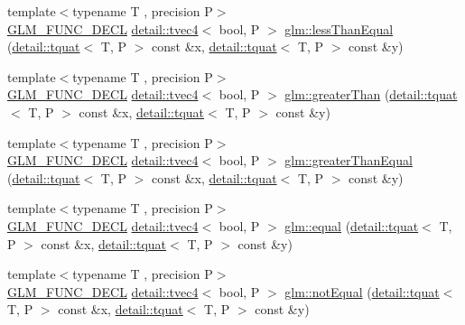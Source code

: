 \begin{DoxyCompactItemize}
\item 
{\footnotesize template$<$typename T , precision P$>$ }\\\hyperlink{setup_8hpp_ab2d052de21a70539923e9bcbf6e83a51}{G\+L\+M\+\_\+\+F\+U\+N\+C\+\_\+\+D\+E\+CL} \hyperlink{structglm_1_1detail_1_1tvec4}{detail\+::tvec4}$<$ bool, P $>$ \hyperlink{group__gtc__quaternion_ga313fe20896a8cd43c6d08cc88fa18faa}{glm\+::less\+Than\+Equal} (\hyperlink{structglm_1_1detail_1_1tquat}{detail\+::tquat}$<$ T, P $>$ const \&x, \hyperlink{structglm_1_1detail_1_1tquat}{detail\+::tquat}$<$ T, P $>$ const \&y)
\item 
{\footnotesize template$<$typename T , precision P$>$ }\\\hyperlink{setup_8hpp_ab2d052de21a70539923e9bcbf6e83a51}{G\+L\+M\+\_\+\+F\+U\+N\+C\+\_\+\+D\+E\+CL} \hyperlink{structglm_1_1detail_1_1tvec4}{detail\+::tvec4}$<$ bool, P $>$ \hyperlink{group__gtc__quaternion_ga63be67bccef0b0ad4e60656223ab3761}{glm\+::greater\+Than} (\hyperlink{structglm_1_1detail_1_1tquat}{detail\+::tquat}$<$ T, P $>$ const \&x, \hyperlink{structglm_1_1detail_1_1tquat}{detail\+::tquat}$<$ T, P $>$ const \&y)
\item 
{\footnotesize template$<$typename T , precision P$>$ }\\\hyperlink{setup_8hpp_ab2d052de21a70539923e9bcbf6e83a51}{G\+L\+M\+\_\+\+F\+U\+N\+C\+\_\+\+D\+E\+CL} \hyperlink{structglm_1_1detail_1_1tvec4}{detail\+::tvec4}$<$ bool, P $>$ \hyperlink{group__gtc__quaternion_gac90d5af34a03cd665a349ac30e4cc44c}{glm\+::greater\+Than\+Equal} (\hyperlink{structglm_1_1detail_1_1tquat}{detail\+::tquat}$<$ T, P $>$ const \&x, \hyperlink{structglm_1_1detail_1_1tquat}{detail\+::tquat}$<$ T, P $>$ const \&y)
\item 
{\footnotesize template$<$typename T , precision P$>$ }\\\hyperlink{setup_8hpp_ab2d052de21a70539923e9bcbf6e83a51}{G\+L\+M\+\_\+\+F\+U\+N\+C\+\_\+\+D\+E\+CL} \hyperlink{structglm_1_1detail_1_1tvec4}{detail\+::tvec4}$<$ bool, P $>$ \hyperlink{group__gtc__quaternion_ga32ff2cc6fb576639a6237d8d8ed5818b}{glm\+::equal} (\hyperlink{structglm_1_1detail_1_1tquat}{detail\+::tquat}$<$ T, P $>$ const \&x, \hyperlink{structglm_1_1detail_1_1tquat}{detail\+::tquat}$<$ T, P $>$ const \&y)
\item 
{\footnotesize template$<$typename T , precision P$>$ }\\\hyperlink{setup_8hpp_ab2d052de21a70539923e9bcbf6e83a51}{G\+L\+M\+\_\+\+F\+U\+N\+C\+\_\+\+D\+E\+CL} \hyperlink{structglm_1_1detail_1_1tvec4}{detail\+::tvec4}$<$ bool, P $>$ \hyperlink{group__gtc__quaternion_gaa3a8cf1aa580e435ca96acafbd7870a5}{glm\+::not\+Equal} (\hyperlink{structglm_1_1detail_1_1tquat}{detail\+::tquat}$<$ T, P $>$ const \&x, \hyperlink{structglm_1_1detail_1_1tquat}{detail\+::tquat}$<$ T, P $>$ const \&y)
\end{DoxyCompactItemize}


